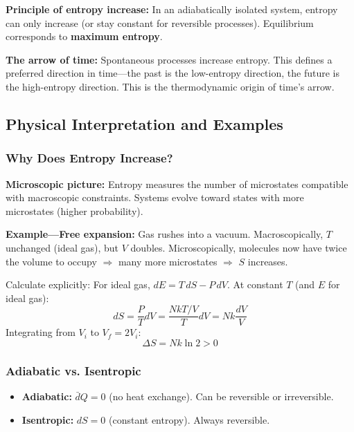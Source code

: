 \documentclass[9pt,twocoloumn]{article}
\begin{document}
\textbf{Principle of entropy increase:} In an adiabatically isolated system, entropy can only increase (or stay constant for reversible processes). Equilibrium corresponds to \textbf{maximum entropy}.

\textbf{The arrow of time:} Spontaneous processes increase entropy. This defines a preferred direction in time—the past is the low-entropy direction, the future is the high-entropy direction. This is the thermodynamic origin of time's arrow.

\subsection{Physical Interpretation and Examples}

\subsubsection{Why Does Entropy Increase?}

\textbf{Microscopic picture:} Entropy measures the number of microstates compatible with macroscopic constraints. Systems evolve toward states with more microstates (higher probability).

\textbf{Example—Free expansion:} Gas rushes into a vacuum. Macroscopically, $T$ unchanged (ideal gas), but $V$ doubles. Microscopically, molecules now have twice the volume to occupy $\Rightarrow$ many more microstates $\Rightarrow$ $S$ increases.

Calculate explicitly: For ideal gas, $dE = T \, dS - P \, dV$. At constant $T$ (and $E$ for ideal gas):
\begin{equation}
dS = \frac{P}{T} dV = \frac{NkT/V}{T} dV = Nk \frac{dV}{V}
\end{equation}
Integrating from $V_i$ to $V_f = 2V_i$:
\begin{equation}
\Delta S = Nk \ln 2 > 0
\end{equation}

\subsubsection{Adiabatic vs. Isentropic}

\begin{itemize}
    \item \textbf{Adiabatic:} $\bar{d}Q = 0$ (no heat exchange). Can be reversible or irreversible.
    \item \textbf{Isentropic:} $dS = 0$ (constant entropy). Always reversible.
\end{itemize}
\end{document}
